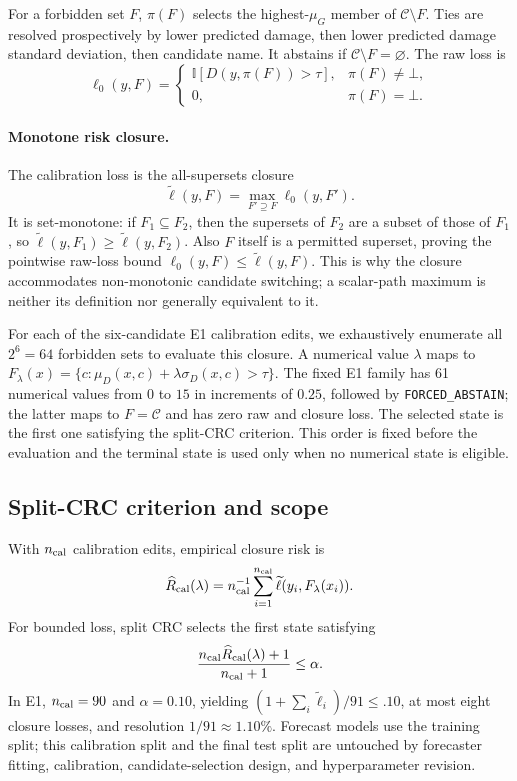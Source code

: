 \documentclass{article} %
\begin{document}
For a forbidden set $F$, $\pi(F)$ selects the highest-$\mu_G$ member of
$\mathcal C\setminus F$. Ties are resolved prospectively by lower predicted
damage, then lower predicted damage standard deviation, then candidate name.
It abstains if $\mathcal C\setminus F=\varnothing$. The raw loss is
\[
\ell_0(y,F)=
\begin{cases}
\mathbb I[D(y,\pi(F))>\tau],&\pi(F)\ne\bot,\\
0,&\pi(F)=\bot.
\end{cases}
\]
\paragraph{Monotone risk closure.}\label{sec:closure}
The calibration loss is the all-supersets closure
\[
\widetilde\ell(y,F)=\max_{F'\supseteq F}\ell_0(y,F').
\]
It is set-monotone: if $F_1\subseteq F_2$, then the supersets of $F_2$ are a
subset of those of $F_1$, so $\widetilde\ell(y,F_1)\geq
\widetilde\ell(y,F_2)$. Also $F$ itself is a permitted superset, proving the
pointwise raw-loss bound $\ell_0(y,F)\leq\widetilde\ell(y,F)$. This is why
the closure accommodates non-monotonic candidate switching; a scalar-path
maximum is neither its definition nor generally equivalent to it.

For each of the six-candidate E1 calibration edits, we exhaustively enumerate
all $2^6=64$ forbidden sets to evaluate this closure. A numerical value
$\lambda$ maps to $F_\lambda(x)=\{c:\mu_D(x,c)+\lambda\sigma_D(x,c)>\tau\}$.
The fixed E1 family has 61 numerical values from $0$ to $15$ in increments of
$0.25$, followed by \texttt{FORCED\_ABSTAIN}; the latter maps to
$F=\mathcal C$ and has zero raw and closure loss. The selected state is the
first one satisfying the split-CRC criterion. This order is fixed before the
evaluation and the terminal state is used only when no numerical state is
eligible.

\subsection{Split-CRC criterion and scope}
\label{sec:crc}

With $n_{\rm cal}$ calibration edits, empirical closure risk is
\[
\widehat R_{\rm cal}(\lambda)=n_{\rm cal}^{-1}
\sum_{i=1}^{n_{\rm cal}}\widetilde\ell(y_i,F_\lambda(x_i)).
\]
For bounded loss, split CRC \citep{angelopoulos2024conformal} selects the first state satisfying
\[
\frac{n_{\rm cal}\widehat R_{\rm cal}(\lambda)+1}{n_{\rm cal}+1}
\leq\alpha.
\]
In E1, $n_{\rm cal}=90$ and $\alpha=0.10$, yielding
$(1+\sum_i\widetilde\ell_i)/91\leq .10$, at most eight closure losses, and
resolution $1/91\approx1.10\%$. Forecast models use the training split; this
calibration split and the final test split are untouched by forecaster fitting,
calibration, candidate-selection design, and hyperparameter revision.
\end{document}
